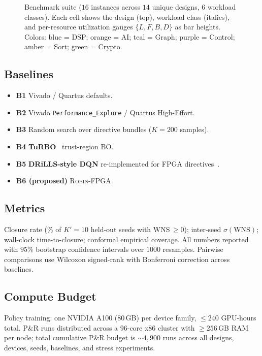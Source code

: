 \documentclass[journal,onecolumn=false]{IEEEtran}
\begin{document}
\begin{figure}[t]
\caption{Benchmark suite ($16$ instances across $14$ unique designs, $6$ workload classes). Each cell shows the design (top), workload class (italics), and per-resource utilization gauges $\{L,F,B,D\}$ as bar heights. Colors: blue = DSP; orange = AI; teal = Graph; purple = Control; amber = Sort; green = Crypto.}
\label{fig:bench}
\end{figure}

\subsection{Baselines}
\begin{itemize}
  \item \textbf{B1} Vivado / Quartus defaults.
  \item \textbf{B2} Vivado \texttt{Performance\_Explore} / Quartus High-Effort.
  \item \textbf{B3} Random search over directive bundles ($K=200$ samples).
  \item \textbf{B4} \textbf{TuRBO}~\cite{eriksson2019turbo} trust-region BO.
  \item \textbf{B5} \textbf{DRiLLS-style DQN} re-implemented for FPGA directives~\cite{hosny2020drills}.
  \item \textbf{B6 (proposed)} \textsc{Robin-FPGA}.
\end{itemize}

\subsection{Metrics}
Closure rate (\% of $K' = 10$ held-out seeds with WNS\,$\geq 0$); inter-seed $\sigma(\mathrm{WNS})$; wall-clock time-to-closure; conformal empirical coverage. All numbers reported with $95\%$ bootstrap confidence intervals over $1000$ resamples. Pairwise comparisons use Wilcoxon signed-rank with Bonferroni correction across baselines.

\subsection{Compute Budget}
Policy training: one NVIDIA A100 (80\,GB) per device family, $\leq 240$ GPU-hours total. P\&R runs distributed across a 96-core x86 cluster with $\geq 256$\,GB RAM per node; total cumulative P\&R budget is $\sim 4{,}900$ runs across all designs, devices, seeds, baselines, and stress experiments.
\end{document}

